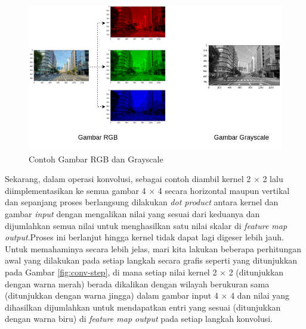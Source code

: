 \begin{figure}[ht]
	\centering
	\includegraphics[scale=0.3]{gambar/rgb-gray-image.png}
	\caption{Contoh Gambar RGB dan Grayscale}
	\label{fig:rgb-gray-image}
\end{figure}

Sekarang, dalam operasi konvolusi, sebagai contoh diambil kernel 2 $\times$ 2 lalu diimplementasikan ke semua gambar 4 $\times$ 4 secara horizontal maupun vertikal dan sepanjang proses berlangsung dilakukan \textit{dot product} antara kernel dan gambar \textit{input} dengan mengalikan nilai yang sesuai dari keduanya dan dijumlahkan semua nilai untuk menghasilkan satu nilai skalar di \textit{feature map output}.Proses ini berlanjut hingga kernel tidak dapat lagi digeser lebih jauh. Untuk memahaminya secara lebih jelas, mari kita lakukan beberapa perhitungan awal yang dilakukan pada setiap langkah secara grafis seperti yang ditunjukkan pada Gambar \ref{fig:conv-step}, di mana setiap nilai kernel 2 $\times$ 2 (ditunjukkan dengan warna merah) berada dikalikan dengan wilayah berukuran sama (ditunjukkan dengan warna jingga) dalam gambar input 4 $\times$ 4 dan nilai yang dihasilkan dijumlahkan untuk mendapatkan entri yang sesuai (ditunjukkan dengan warna biru) di \textit{feature map output} pada setiap langkah konvolusi.

